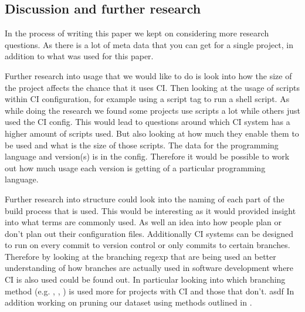 \documentclass[twoside,12pt,titlepage,a4paper]{article}
\begin{document}
\vspace*{-0.05in}
\subsection{Discussion and further research}
\vspace*{-0.05in}
In the process of writing this paper we kept on considering more research questions. As there is a lot of meta data that you can get for a single project, in addition to what was used for this paper.

Further research into usage that we would like to do is look into how the size of the project affects the chance that it uses CI. Then looking at the usage of scripts within CI configuration, for example using a script tag to run a shell script. As while doing the research we found some projects use scripts a lot while others just used the CI config. This would lead to questions around which CI system has a higher amount of scripts used. But also looking at how much they enable them to be used and what is the size of those scripts.
The data for the programming language and version(s) is in the config. Therefore it would be possible to work out how much usage each version is getting of a particular programming language.

Further research into structure could look into the naming of each part of the build process that is used. This would be interesting as it would provided insight into what terms are commonly used. As well an idea into how people plan or don't plan out their configuration files.
Additionally CI systems can be designed to run on every commit to version control or only commits to certain branches. Therefore by looking at the branching regexp that are being used an better understanding of how branches are actually used in software development where CI is also used could be found out. In particular looking into which branching method (e.g. \citet{BranchGITFLOW2010}, \citet{BranchGITHUBFLOW2017}, \citet{BranchTrunk2013}) is used more for projects with CI and those that don't. 
asdf
In addition working on pruning our dataset using methods outlined in \cite{Kalliamvakou2014}. 


\end{document}
